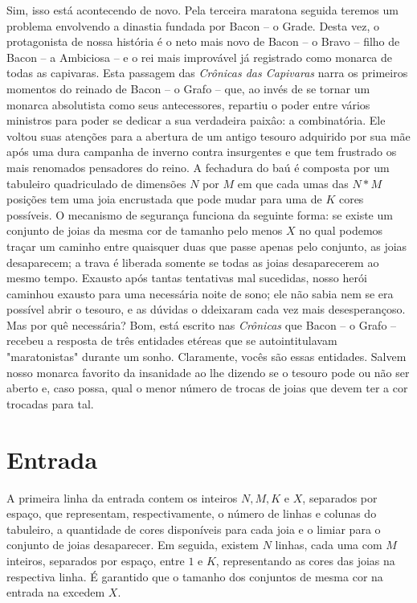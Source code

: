 Sim, isso está acontecendo de novo.
Pela terceira maratona seguida teremos um problema envolvendo a dinastia fundada por Bacon -- o Grade.
Desta vez, o protagonista de nossa história é o neto mais novo de Bacon -- o Bravo -- filho de Bacon -- a Ambiciosa -- e o rei mais improvável já registrado como monarca de todas as capivaras.
Esta passagem das \textit{Crônicas das Capivaras} narra os primeiros momentos do reinado de Bacon -- o Grafo -- que, ao invés de se tornar um monarca absolutista como seus antecessores, repartiu o poder entre vários ministros para poder se dedicar a sua verdadeira paixâo: a combinatória.
Ele voltou suas atenções para a abertura de um antigo tesouro adquirido por sua mãe após uma dura campanha de inverno contra insurgentes e que tem frustrado os mais renomados pensadores do reino.
A fechadura do baú é composta por um tabuleiro quadriculado de dimensões $N$ por $M$ em que cada umas das $N*M$ posições tem uma joia encrustada que pode mudar para uma de $K$ cores possíveis.
O mecanismo de segurança funciona da seguinte forma: se existe um conjunto de joias da mesma cor de tamanho pelo menos $X$ no qual podemos traçar um caminho entre quaisquer duas que passe apenas pelo conjunto, as joias desaparecem; a trava é liberada somente se todas as joias desaparecerem ao mesmo tempo.
Exausto após tantas tentativas mal sucedidas, nosso herói caminhou exausto para uma necessária noite de sono; ele não sabia nem se era possível abrir o tesouro, e as dúvidas o ddeixaram cada vez mais desesperançoso.
Mas por quê necessária?
Bom, está escrito nas \textit{Crônicas} que Bacon -- o Grafo -- recebeu a resposta de três entidades etéreas que se autointitulavam "maratonistas" durante um sonho.
Claramente, vocês são essas entidades.
Salvem nosso monarca favorito da insanidade ao lhe dizendo se o tesouro pode ou não ser aberto e, caso possa, qual o menor número de trocas de joias que devem ter a cor trocadas para tal.


\section*{Entrada}

A primeira linha da entrada contem os inteiros $N, M, K$ e $X$, separados por espaço, que representam, respectivamente, o número de linhas e colunas do tabuleiro, a quantidade de cores disponíveis para cada joia e o limiar para o conjunto de joias desaparecer.
Em seguida, existem $N$ linhas, cada uma com $M$ inteiros, separados por espaço, entre $1$ e $K$, representando as cores das joias na respectiva linha.
É garantido que o tamanho dos conjuntos de mesma cor na entrada na excedem $X$.

